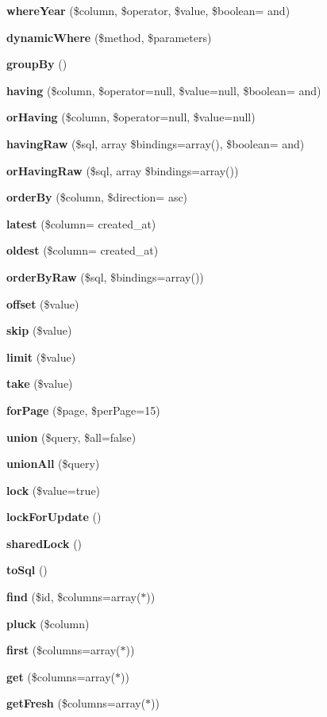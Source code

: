\begin{DoxyCompactItemize}
{\bf where\+Year} (\$column, \$operator, \$value, \$boolean= \textquotesingle{}and\textquotesingle{})
\item 
{\bf dynamic\+Where} (\$method, \$parameters)
\item 
{\bf group\+By} ()
\item 
{\bf having} (\$column, \$operator=null, \$value=null, \$boolean= \textquotesingle{}and\textquotesingle{})
\item 
{\bf or\+Having} (\$column, \$operator=null, \$value=null)
\item 
{\bf having\+Raw} (\$sql, array \$bindings=array(), \$boolean= \textquotesingle{}and\textquotesingle{})
\item 
{\bf or\+Having\+Raw} (\$sql, array \$bindings=array())
\item 
{\bf order\+By} (\$column, \$direction= \textquotesingle{}asc\textquotesingle{})
\item 
{\bf latest} (\$column= \textquotesingle{}created\+\_\+at\textquotesingle{})
\item 
{\bf oldest} (\$column= \textquotesingle{}created\+\_\+at\textquotesingle{})
\item 
{\bf order\+By\+Raw} (\$sql, \$bindings=array())
\item 
{\bf offset} (\$value)
\item 
{\bf skip} (\$value)
\item 
{\bf limit} (\$value)
\item 
{\bf take} (\$value)
\item 
{\bf for\+Page} (\$page, \$per\+Page=15)
\item 
{\bf union} (\$query, \$all=false)
\item 
{\bf union\+All} (\$query)
\item 
{\bf lock} (\$value=true)
\item 
{\bf lock\+For\+Update} ()
\item 
{\bf shared\+Lock} ()
\item 
{\bf to\+Sql} ()
\item 
{\bf find} (\$id, \$columns=array(\textquotesingle{}$\ast$\textquotesingle{}))
\item 
{\bf pluck} (\$column)
\item 
{\bf first} (\$columns=array(\textquotesingle{}$\ast$\textquotesingle{}))
\item 
{\bf get} (\$columns=array(\textquotesingle{}$\ast$\textquotesingle{}))
\item 
{\bf get\+Fresh} (\$columns=array(\textquotesingle{}$\ast$\textquotesingle{}))

\end{DoxyCompactItemize}

